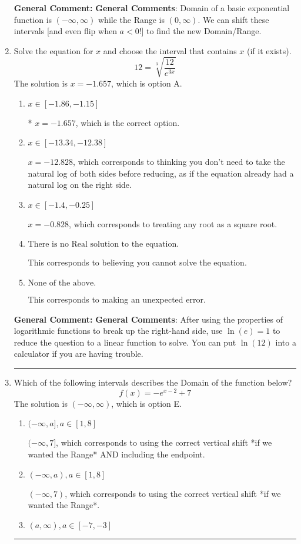\documentclass{extbook}[14pt]
\newcommand{\litem}[1]{\item #1

\rule{\textwidth}{0.4pt}}
\begin{document}
\begin{enumerate}
{\textbf{General Comment:} \textbf{General Comments}: Domain of a basic exponential function is $(-\infty, \infty)$ while the Range is $(0, \infty)$. We can shift these intervals [and even flip when $a<0$!] to find the new Domain/Range.
}
\litem{
 Solve the equation for $x$ and choose the interval that contains $x$ (if it exists).
\[  12 = \sqrt[3]{\frac{12}{e^{3x}}} \]The solution is \( x = -1.657 \), which is option A.\begin{enumerate}[label=\Alph*.]
\item \( x \in [-1.86, -1.15] \)

* $x = -1.657$, which is the correct option.
\item \( x \in [-13.34, -12.38] \)

$x = -12.828$, which corresponds to thinking you don't need to take the natural log of both sides before reducing, as if the equation already had a natural log on the right side.
\item \( x \in [-1.4, -0.25] \)

$x = -0.828$, which corresponds to treating any root as a square root.
\item \( \text{There is no Real solution to the equation.} \)

This corresponds to believing you cannot solve the equation.
\item \( \text{None of the above.} \)

This corresponds to making an unexpected error.
\end{enumerate}

\textbf{General Comment:} \textbf{General Comments}: After using the properties of logarithmic functions to break up the right-hand side, use $\ln(e) = 1$ to reduce the question to a linear function to solve. You can put $\ln(12)$ into a calculator if you are having trouble.
}
\litem{
Which of the following intervals describes the Domain of the function below?
\[ f(x) = -e^{x-2}+7 \]The solution is \( (-\infty, \infty) \), which is option E.\begin{enumerate}[label=\Alph*.]
\item \( (-\infty, a], a \in [1, 8] \)

$(-\infty, 7]$, which corresponds to using the correct vertical shift *if we wanted the Range* AND including the endpoint.
\item \( (-\infty, a), a \in [1, 8] \)

$(-\infty, 7)$, which corresponds to using the correct vertical shift *if we wanted the Range*.
\item \( (a, \infty), a \in [-7, -3] \)


\end{enumerate}}
\end{enumerate}
\end{document}
